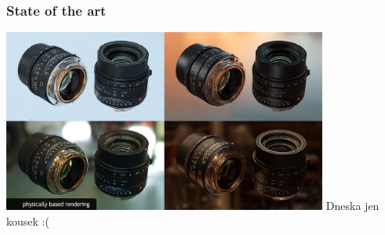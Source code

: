 \begin{frame}
    \frametitle{State of the art}
    \includegraphics[width=0.8\textwidth]{pics/physicallyBasedRendering/pbr}
    \pause\vfill
    Dneska jen kousek :(
\end{frame}

